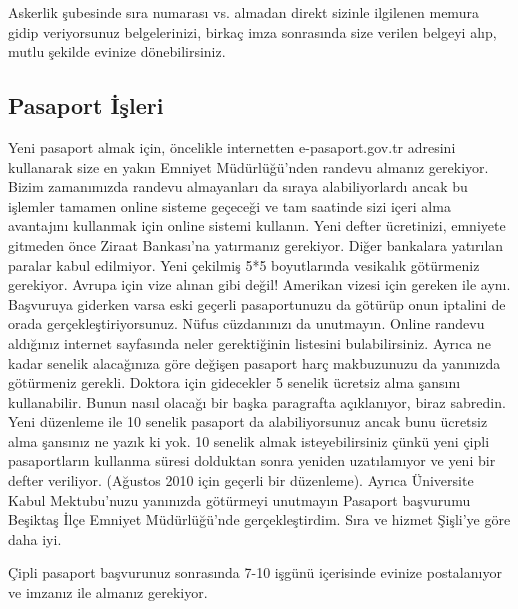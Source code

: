 \documentclass[12pt]{article}
\begin{document}
Askerlik şubesinde sıra numarası vs. almadan direkt sizinle ilgilenen memura gidip veriyorsunuz belgelerinizi, birkaç imza sonrasında size verilen belgeyi alıp, mutlu şekilde evinize dönebilirsiniz. 

\subsection{Pasaport İşleri}
Yeni pasaport almak için, öncelikle internetten e-pasaport.gov.tr adresini kullanarak size en yakın Emniyet Müdürlüğü'nden randevu almanız gerekiyor. Bizim zamanımızda randevu almayanları da sıraya alabiliyorlardı ancak bu işlemler tamamen online sisteme geçeceği ve tam saatinde sizi içeri alma avantajını kullanmak için online sistemi kullanın. Yeni defter ücretinizi, emniyete gitmeden önce Ziraat Bankası'na yatırmanız gerekiyor. Diğer bankalara yatırılan paralar kabul edilmiyor. Yeni çekilmiş 5*5 boyutlarında vesikalık götürmeniz gerekiyor. Avrupa için vize alınan gibi değil! Amerikan vizesi için gereken ile aynı. Başvuruya giderken varsa eski geçerli pasaportunuzu da götürüp onun iptalini de orada gerçekleştiriyorsunuz. Nüfus cüzdanınızı da unutmayın. Online randevu aldığınız internet sayfasında neler gerektiğinin listesini bulabilirsiniz. Ayrıca ne kadar senelik alacağınıza göre değişen pasaport harç makbuzunuzu da yanınızda götürmeniz gerekli. Doktora için gidecekler 5 senelik ücretsiz alma şansını kullanabilir. Bunun nasıl olacağı bir başka paragrafta açıklanıyor, biraz sabredin. Yeni düzenleme ile 10 senelik pasaport da alabiliyorsunuz ancak bunu ücretsiz alma şansınız ne yazık ki yok. 10 senelik almak isteyebilirsiniz çünkü yeni çipli pasaportların kullanma süresi dolduktan sonra yeniden uzatılamıyor ve yeni bir defter veriliyor. (Ağustos 2010 için geçerli bir düzenleme). Ayrıca Üniversite Kabul Mektubu’nuzu yanınızda götürmeyi unutmayın Pasaport başvurumu Beşiktaş İlçe Emniyet Müdürlüğü’nde gerçekleştirdim. Sıra ve hizmet Şişli’ye göre daha iyi. 

Çipli pasaport başvurunuz sonrasında 7-10 işgünü içerisinde evinize postalanıyor ve imzanız ile almanız gerekiyor. 
\end{document}

